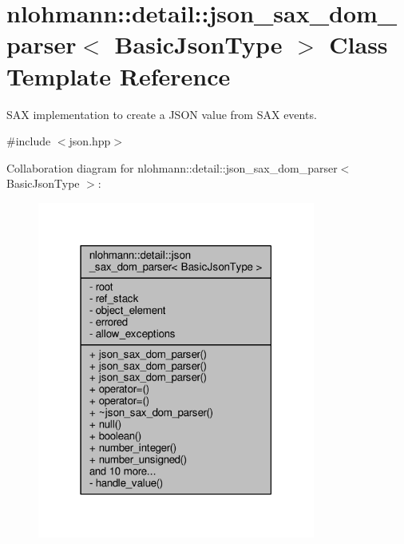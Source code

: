 \hypertarget{classnlohmann_1_1detail_1_1json__sax__dom__parser}{}\section{nlohmann\+:\+:detail\+:\+:json\+\_\+sax\+\_\+dom\+\_\+parser$<$ Basic\+Json\+Type $>$ Class Template Reference}
\label{classnlohmann_1_1detail_1_1json__sax__dom__parser}


S\+AX implementation to create a J\+S\+ON value from S\+AX events.  




{\ttfamily \#include $<$json.\+hpp$>$}



Collaboration diagram for nlohmann\+:\+:detail\+:\+:json\+\_\+sax\+\_\+dom\+\_\+parser$<$ Basic\+Json\+Type $>$\+:
\nopagebreak
\begin{figure}[H]
\begin{center}
\leavevmode
\includegraphics[width=259pt]{classnlohmann_1_1detail_1_1json__sax__dom__parser__coll__graph}
\end{center}
\end{figure}
